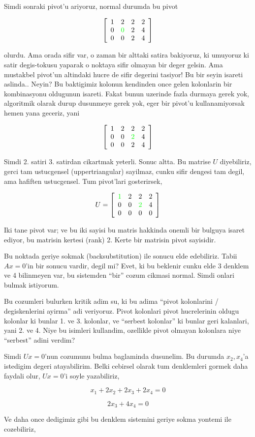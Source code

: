 \documentclass[12pt,fleqn]{article}\usepackage{../common}
\begin{document}
Simdi sonraki pivot'u ariyoruz, normal durumda bu pivot

$$ 
\left[\begin{array}{rrrr}
1 & 2 & 2 & 2  \\
0 & \textcolor{green}{0} & 2 & 4 \\
0 & 0 & 2 & 4
\end{array}\right]
 $$

olurdu. Ama orada sifir var, o zaman bir alttaki satira bakiyoruz, ki
umuyoruz ki satir degis-tokusu yaparak o noktaya sifir olmayan bir deger
gelsin. Ama mustakbel pivot'un altindaki hucre de sifir degerini tasiyor!
Bu bir seyin isareti aslinda.. Neyin? Bu baktigimiz kolonun kendinden once
gelen kolonlarin bir kombinasyonu oldugunun isareti. Fakat bunun uzerinde
fazla durmaya gerek yok, algoritmik olarak durup dusunmeye gerek yok, eger
bir pivot'u kullanamiyorsak hemen yana geceriz, yani

$$ 
\left[\begin{array}{rrrr}
1 & 2 & 2 & 2  \\
0 & 0 & \textcolor{green}{2} & 4 \\
0 & 0 & 2 & 4
\end{array}\right]
 $$

Simdi 2. satiri 3. satirdan cikartmak yeterli. Sonuc altta. Bu matrise $U$
diyebiliriz, gerci tam ustucgensel (uppertriangular) sayilmaz, cunku
sifir dengesi tam degil, ama hafiften ustucgensel. Tum pivot'lari
gosterirsek, 

$$ 
U = 
\left[\begin{array}{rrrr}
\textcolor{green}{1} & 2 & 2 & 2  \\
0 & 0 & \textcolor{green}{2} & 4 \\
0 & 0 & 0 & 0
\end{array}\right]
 $$

Iki tane pivot var; ve bu iki sayisi bu matris hakkinda onemli bir bulguya
isaret ediyor, bu matrisin kertesi (rank) 2. Kerte bir matrisin pivot
sayisidir. 

Bu noktada geriye sokmak (backsubstitution) ile sonucu elde
edebiliriz. Tabii $Ax=0$'in bir sonucu vardir, degil mi? Evet, ki bu
beklenir cunku elde 3 denklem ve 4 bilinmeyen var, bu sistemden ``bir''
cozum cikmasi normal. Simdi onlari bulmak istiyorum.

Bu cozumleri bulurken kritik adim su, ki bu adima ``pivot kolonlarini /
degiskenlerini ayirma'' adi veriyoruz. Pivot kolonlari pivot hucrelerinin
oldugu kolonlar ki bunlar 1. ve 3. kolonlar, ve ``serbest kolonlar'' ki
bunlar geri kalanlari, yani 2. ve 4. Niye bu isimleri kullandim, ozellikle
pivot olmayan kolonlara niye ``serbest'' adini verdim?

Simdi $Ux=0$'nun cozumunu bulma baglaminda dusunelim. Bu durumda
$x_2,x_4$'a istedigim degeri atayabilirim. Belki cebirsel olarak tum
denklemleri gormek daha faydali olur, $Ux=0$'i soyle yazabiliriz, 

$$ x_1 + 2x_2 + 2x_3 + 2x_4 = 0 $$

$$ 2x_3 + 4x_4 = 0 $$

Ve daha once dedigimiz gibi bu denklem sistemini geriye sokma yontemi ile
cozebiliriz, 
\end{document}
